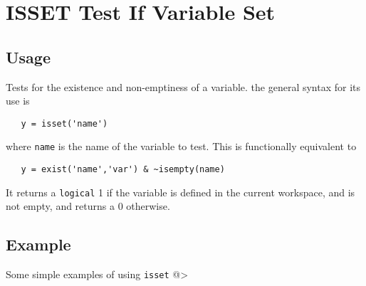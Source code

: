 \section{ISSET Test If Variable Set}

\subsection{Usage}

Tests for the existence and non-emptiness of a variable.
the general syntax for its use is
\begin{verbatim}
   y = isset('name')
\end{verbatim}
where \verb|name| is the name of the variable to test.  This
is functionally equivalent to 
\begin{verbatim}
   y = exist('name','var') & ~isempty(name)
\end{verbatim}
It returns a \verb|logical| 1 if the variable is defined 
in the current workspace, and is not empty, and returns
a 0 otherwise.
\subsection{Example}

Some simple examples of using \verb|isset|
@>
